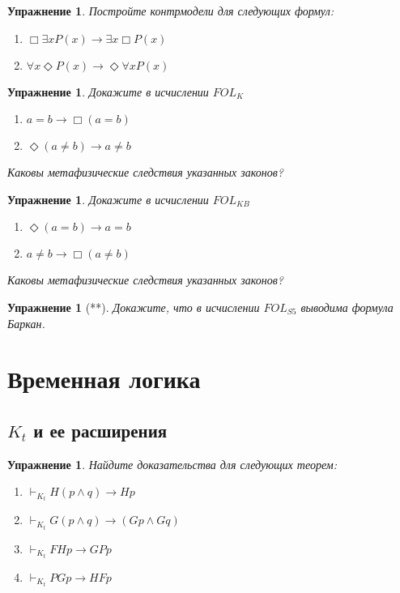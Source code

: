 \documentclass[11pt]{article}
\newtheorem{exercise}[theorem]{Упражнение}
\begin{document}
\begin{exercise} Постройте контрмодели  для следующих формул:
\begin{multicols}{2}
\begin{enumerate}
    \item $ \Box \exists x P(x) \to \exists x \Box P(x)$
    \item $ \forall x \Diamond P(x) \to \Diamond \forall x  P(x)$
\end{enumerate}
\end{multicols}
\end{exercise}

\begin{exercise} Докажите  в исчислении $FOL_{K}$
\begin{multicols}{2}
\begin{enumerate}
	\item $a = b \to \Box (a = b)$	
	\item $\Diamond (a \not = b) \to a  \not = b$	
\end{enumerate}
\end{multicols}
Каковы метафизические следствия указанных законов?
\end{exercise}

\begin{exercise} Докажите в исчислении $FOL_{KB}$
\begin{multicols}{2}
\begin{enumerate}
	\item $\Diamond (a = b) \to a = b$	
	\item $a \not = b \to \Box (a \not = b)$	  
	\end{enumerate}
\end{multicols}
Каковы метафизические следствия указанных законов?
\end{exercise}

\begin{exercise}[**] Докажите, что в исчислении $FOL_{S5} $ выводима формула Баркан.
\end{exercise}

\section{Временная логика}
\subsection{$K_t$ и ее расширения}
\begin{exercise} Найдите доказательства для следующих теорем:
\begin{multicols}{2}
\begin{enumerate}
	\item $\vdash_{K_t} H (p \wedge q) \to Hp$
	\item $\vdash_{K_t} G (p \wedge q) \to (G p \wedge Gq)$
	\item $\vdash_{K_t} FHp \to GPp$
	\item $\vdash_{K_t} PGp \to HFp$
\end{enumerate}
\end{multicols}
\end{exercise}
\end{document}
